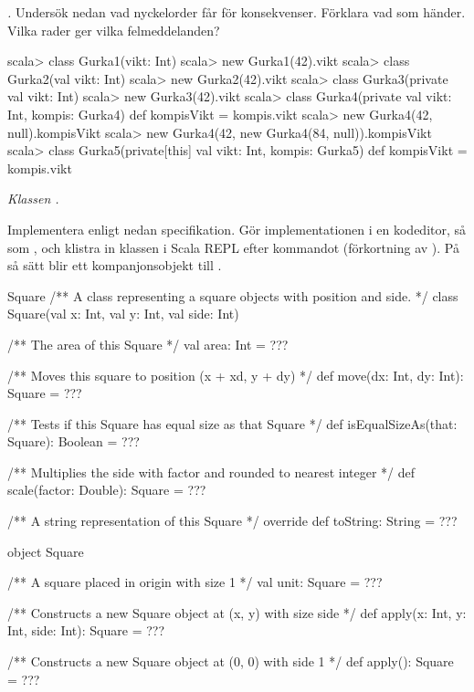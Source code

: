 

\Exercise{\ExeWeekSIX}

\begin{Goals}
\item 
\end{Goals}

\begin{Preparations}
\item 
\end{Preparations}

\BasicTasks %


\Task \emph{.} Undersök nedan vad nyckelorder  får för konsekvenser. Förklara vad som händer. Vilka rader ger vilka felmeddelanden?

\begin{REPL}
scala> class Gurka1(vikt: Int)
scala> new Gurka1(42).vikt
scala> class Gurka2(val vikt: Int)
scala> new Gurka2(42).vikt
scala> class Gurka3(private val vikt: Int)
scala> new Gurka3(42).vikt
scala> class Gurka4(private val vikt: Int, kompis: Gurka4){
         def kompisVikt = kompis.vikt
       }
scala> new Gurka4(42, null).kompisVikt
scala> new Gurka4(42, new Gurka4(84, null)).kompisVikt
scala> class Gurka5(private[this] val vikt: Int, kompis: Gurka5){
         def kompisVikt = kompis.vikt
       }
\end{REPL}


\Task \label{task:Square} \emph{Klassen .} 

\Subtask Implementera  enligt nedan specifikation. Gör  implementationen i en kodeditor, så som , och klistra in klassen i Scala REPL efter kommandot  (förkortning av ). På så sätt blir  ett kompanjonsobjekt till .

\begin{ScalaSpec}{Square}
/** A class representing a square objects with position and side. */
class Square(val x: Int, val y: Int, val side: Int) {
  /** The area of this Square */
  val area: Int = ???
  
  /** Moves this square to position (x + xd, y + dy) */
  def move(dx: Int, dy: Int): Square = ???
  
  /** Tests if this Square has equal size as that Square */
  def isEqualSizeAs(that: Square): Boolean = ???
  
  /** Multiplies the side with factor and rounded to nearest integer */
  def scale(factor: Double): Square = ???
  
  /** A string representation of this Square */
  override def toString: String = ???
}

object Square {
  /** A square placed in origin with size 1 */
  val unit: Square = ??? 
  
  /** Constructs a new Square object at (x, y) with size side */
  def apply(x: Int, y: Int, side: Int): Square = ???

  /** Constructs a new Square object at (0, 0) with side 1 */
  def apply(): Square = ???
}
\end{ScalaSpec}

